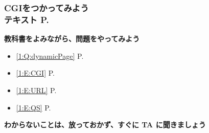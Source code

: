 \begin{frame}[fragile]
	\frametitle{CGIをつかってみよう\\テキスト P.\pageref{1:P:slide_p28}~~~}
      \large\textbf{教科書をよみながら、問題をやってみよう}
				\begin{itemize}\small
					\item \ref*{1:Q:dynamicPage} P.\pageref{1:Q:dynamicPage}
					\item \ref*{1:E:CGI} P.\pageref{1:E:CGI}
					\item \ref*{1:E:URL} P.\pageref{1:E:URL}
					\item \ref*{1:E:QS}  P.\pageref{1:E:QS}
				\end{itemize}
      \vfill
      \large\textbf{わからないことは、放っておかず、すぐに TA に聞きましょう}
\end{frame}
